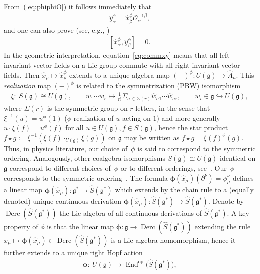 \documentclass[pdftex]{sigma}
\def\gg{\mathfrak{g}}
\def\Derc{\operatorname{Derc}}
\def\End{\operatorname{End}}
\def\hx{\hat{x}}
\numberwithin{equation}{section}
\begin{document}
From~(\ref{eq:phiphiO}) it follows immediately that
\begin{gather}\label{eq:yeqxO}
\hat{y}^\phi_\alpha = \hat{x}^\phi_\beta \mathcal{O}^{-1\beta}_\alpha,
\end{gather}
and one can also prove (see, e.g., \cite[Appendix~1]{halg})
\begin{gather}\label{eq:commxy}
[\hat{x}^\phi_\alpha,\hat{y}^\phi_\beta] = 0.
\end{gather}
In the geometric interpretation, equation~\eqref{eq:commxy} means that all left invariant vector fields on a Lie group commute with all right invariant vector fields. Then $\hx_\rho\mapsto\hx_\rho^\phi$ extends to a unique algebra map $(-)^\phi\colon U(\gg)\to\hat{A}_n$. This {\it realization} map $(-)^\phi$ is related to the symmetrization (PBW) isomorphism
\begin{gather*}%
\xi\colon \ S(\gg)\cong U(\gg),\qquad w_1\cdots w_r\mapsto \frac{1}{r!}
\Sigma_{\sigma\in \Sigma(r)} \hat{w}_{\sigma 1}\cdots \hat{w}_{\sigma r}, \qquad w_i\in\gg\hookrightarrow U(\gg),
\end{gather*}
where $\Sigma(r)$ is the symmetric group on $r$ letters, in the sense that $\xi^{-1}(u)= u^\phi(1)$ ($\phi$-realization of $u$ acting on $1$) and more generally $u\cdot\xi(f) = u^\phi(f)$ for all $u\in U(\gg),f\in S(\gg)$, hence the star product $f\star g:=\xi^{-1}(\xi(f)\cdot_{U(\gg)}\xi(g))$ on $\gg$ may be written as $f\star g = \xi(f)^\phi(g)$. Thus, in physics literature, our choice of~$\phi$ is said to correspond to the symmetric ordering. Analogously, other coalgebra isomorphisms $S(\gg)\cong U(\gg)$ identical on $\gg$ correspond to different choices of~$\phi$ or to different orderings, see~\cite{scopr}. Our~$\phi$ corresponds to the symmetric ordering~\cite{ldWeyl}. The formula ${\boldsymbol \phi}(\hat{x}_\mu)(\partial^\nu) = \phi^\nu_\mu$ defines a linear map ${\boldsymbol \phi}(\hat{x}_\mu)\colon \gg^*\to\hat{S}(\gg^*)$ which extends by the chain rule to a (equally denoted) unique continuous derivation ${\boldsymbol \phi}(\hat{x}_\mu)\colon \hat{S}(\gg^*)\to\hat{S}(\gg^*)$. Denote by $\Derc(\hat{S}(\gg^*))$ the Lie algebra of all continuous derivations of $\hat{S}(\gg^*)$. A key property of $\phi$ is that the linear map ${\boldsymbol \phi}\colon \gg\to\Derc(\hat{S}(\gg^*))$ extending the rule $\hat{x}_\mu\mapsto{\boldsymbol \phi}(\hat{x}_\mu)\in\Derc(\hat{S}(\gg^*))$ is a Lie algebra homomorphism, hence it further extends to a unique right Hopf action
\begin{gather*}
{\boldsymbol \phi}\colon \ U(\gg)\to \End^{\mathrm{op}}\big(\hat{S}(\gg^*)\big),
\end{gather*}
\end{document}
